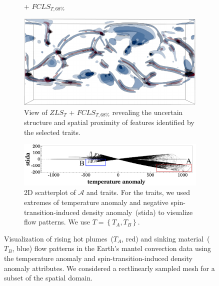\begin{figure}[!h]
\begin{subfigure}{0.195\linewidth}
\vspace{-3mm}
\caption{+ $FCLS_{T,68\%}$}
\label{fig:mantel_fcls_68}
\end{subfigure}
\begin{subfigure}{0.29\linewidth}
\centering
\includegraphics[width=0.9\linewidth]{Images/Mantel/fcls_68_v2.pdf}
\caption{View of $ZLS_{T}$ + $FCLS_{T,68\%}$ revealing the uncertain structure and spatial proximity of features identified by the selected traits.}
\label{fig:mantel_fcls_68_v2}
\end{subfigure}
\hfill
\begin{subfigure}{0.295\linewidth}
\centering
\includegraphics[width=\linewidth]{Images/Mantel/scatterplot.pdf}
\caption{2D scatterplot of $\mathcal{A}$ and traits. For the traits, we used extremes of temperature anomaly and negative spin-transition-induced density anomaly~(stida) to visualize flow patterns. We use $T = \left\{T_{A}, T_{B}\right\}$.} 
\label{fig:mantel_scatterplot}
\end{subfigure}
\caption{Visualization of rising hot plumes~($T_{A}$, red) and sinking material~($T_{B}$, blue) flow patterns in the Earth's mantel convection data using the temperature anomaly and spin-transition-induced density anomaly attributes. We considered a rectlinearly sampled mesh for a subset of the spatial domain.}
\label{fig:mantel}
\end{figure}
